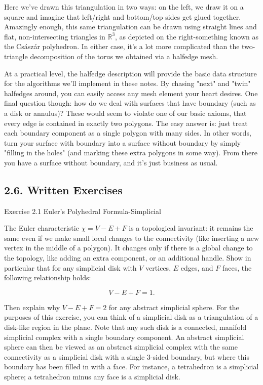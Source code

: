 \documentclass[10pt]{article}
\begin{document}
Here we've drawn this triangulation in two ways: on the left, we draw it on a square and imagine that left/right and bottom/top sides get glued together. Amazingly enough, this same triangulation can be drawn using straight lines and flat, non-intersecting triangles in $\mathbb{R}^{3}$, as depicted on the right-something known as the Császár polyhedron. In either case, it's a lot more complicated than the two-triangle decomposition of the torus we obtained via a halfedge mesh.

At a practical level, the halfedge description will provide the basic data structure for the algorithms we'll implement in these notes. By chasing "next" and "twin" halfedges around, you can easily access any mesh element your heart desires. One final question though: how do we deal with surfaces that have boundary (such as a disk or annulus)? These would seem to violate one of our basic axioms, that every edge is contained in exactly two polygons. The easy answer is: just treat each boundary component as a single polygon with many sides. In other words, turn your surface with boundary into a surface without boundary by simply "filling in the holes" (and marking these extra polygons in some way). From there you have a surface without boundary, and it's just business as usual.

\subsection*{2.6. Written Exercises}
Exercise 2.1 Euler's Polyhedral Formula-Simplicial

The Euler characteristic $\chi=V-E+F$ is a topological invariant: it remains the same even if we make small local changes to the connectivity (like inserting a new vertex in the middle of a polygon). It changes only if there is a global change to the topology, like adding an extra component, or an additional handle. Show in particular that for any simplicial disk with $V$ vertices, $E$ edges, and $F$ faces, the following relationship holds:

$$
V-E+F=1 .
$$

Then explain why $V-E+F=2$ for any abstract simplicial sphere. For the purposes of this exercise, you can think of a simplicial disk as a triangulation of a disk-like region in the plane. Note that any such disk is a connected, manifold simplicial complex with a single boundary component. An abstract simplicial sphere can then be viewed as an abstract simplicial complex with the same connectivity as a simplicial disk with a single 3-sided boundary, but where this boundary has been filled in with a face. For instance, a tetrahedron is a simplicial sphere; a tetrahedron minus any face is a simplicial disk.
\end{document}

